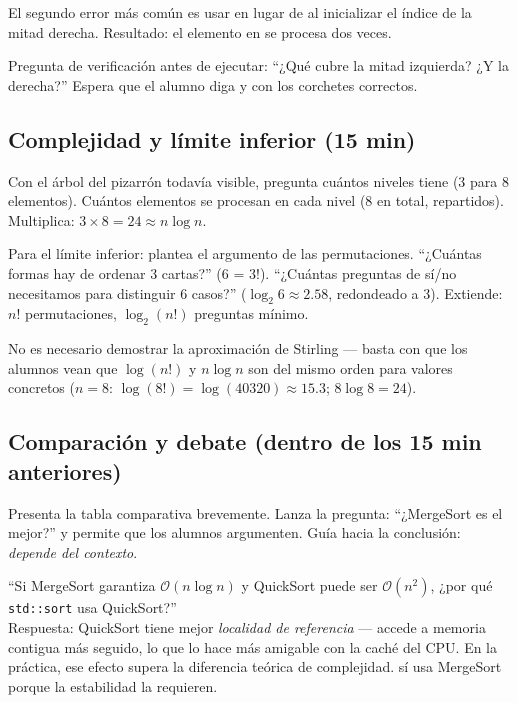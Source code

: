 \documentclass[12pt, oneside]{article}
\begin{document}
\begin{notaprofesor}
  El segundo error más común es usar  en lugar de
   al inicializar el índice de la mitad derecha.
  Resultado: el elemento en  se procesa dos veces.
  \par\smallskip
  Pregunta de verificación antes de ejecutar: ``¿Qué cubre la mitad
  izquierda? ¿Y la derecha?'' Espera que el alumno diga
   y  con los corchetes correctos.
\end{notaprofesor}

\subsection{Complejidad y límite inferior (15 min)}

Con el árbol del pizarrón todavía visible, pregunta cuántos niveles tiene
(3 para 8 elementos). Cuántos elementos se procesan en cada nivel (8 en
total, repartidos). Multiplica: $3 \times 8 = 24 \approx n \log n$.

Para el límite inferior: plantea el argumento de las permutaciones.
``¿Cuántas formas hay de ordenar 3 cartas?'' (6 = 3!). ``¿Cuántas preguntas
de sí/no necesitamos para distinguir 6 casos?'' ($\log_2 6 \approx 2.58$,
redondeado a 3). Extiende: $n!$ permutaciones, $\log_2(n!)$ preguntas mínimo.

No es necesario demostrar la aproximación de Stirling — basta con que
los alumnos vean que $\log(n!)$ y $n \log n$ son del mismo orden para
valores concretos ($n=8$: $\log(8!) = \log(40320) \approx 15.3$;
$8 \log 8 = 24$).

\subsection{Comparación y debate (dentro de los 15 min anteriores)}

Presenta la tabla comparativa brevemente. Lanza la pregunta:
``¿MergeSort es el mejor?'' y permite que los alumnos argumenten.
Guía hacia la conclusión: \textit{depende del contexto}.

\begin{notaprofesor}
  ``Si MergeSort garantiza $\mathcal{O}(n \log n)$ y QuickSort puede ser
  $\mathcal{O}(n^2)$, ¿por qué \texttt{std::sort} usa QuickSort?''\\
  Respuesta: QuickSort tiene mejor \textit{localidad de referencia} — accede
  a memoria contigua más seguido, lo que lo hace más amigable con la caché del
  CPU. En la práctica, ese efecto supera la diferencia teórica de complejidad.
   sí usa MergeSort porque la estabilidad la requieren.
\end{notaprofesor}
\end{document}
